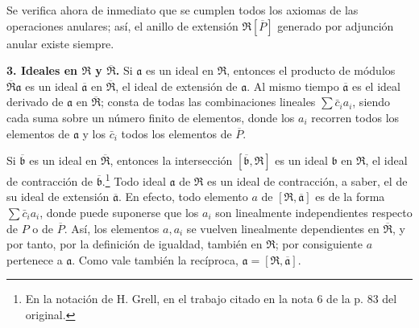 \documentclass[11pt]{article}
\begin{document}
Se verifica ahora de inmediato que se cumplen todos los axiomas de las operaciones anulares; así, el anillo de extensión $\mathfrak R[\overline P]$ generado por adjunción anular existe siempre.

\textbf{3. Ideales en $\mathfrak R$ y $\overline{\mathfrak R}$.} Si $\mathfrak a$ es un ideal en $\mathfrak R$, entonces el producto de módulos $\overline{\mathfrak R}\mathfrak a$ es un ideal $\overline{\mathfrak a}$ en $\overline{\mathfrak R}$, el ideal de extensión de $\mathfrak a$. Al mismo tiempo $\overline{\mathfrak a}$ es el ideal derivado de $\mathfrak a$ en $\overline{\mathfrak R}$; consta de todas las combinaciones lineales $\sum \bar c_i a_i$, siendo cada suma sobre un número finito de elementos, donde los $a_i$ recorren todos los elementos de $\mathfrak a$ y los $\bar c_i$ todos los elementos de $\overline P$.

Si $\overline{\mathfrak b}$ es un ideal en $\overline{\mathfrak R}$, entonces la intersección $[\overline{\mathfrak b},\mathfrak R]$ es un ideal $\mathfrak b$ en $\mathfrak R$, el ideal de contracción de $\overline{\mathfrak b}$.\footnote{En la notación de H. Grell, en el trabajo citado en la nota 6 de la p. 83 del original.} Todo ideal $\mathfrak a$ de $\mathfrak R$ es un ideal de contracción, a saber, el de su ideal de extensión $\overline{\mathfrak a}$. En efecto, todo elemento $a$ de $[\mathfrak R,\overline{\mathfrak a}]$ es de la forma $\sum\bar c_i a_i$, donde puede suponerse que los $a_i$ son linealmente independientes respecto de $P$ o de $\overline P$. Así, los elementos $a,a_i$ se vuelven linealmente dependientes en $\overline{\mathfrak R}$, y por tanto, por la definición de igualdad, también en $\mathfrak R$; por consiguiente $a$ pertenece a $\mathfrak a$. Como vale también la recíproca, $\mathfrak a=[\mathfrak R,\overline{\mathfrak a}]$.
\end{document}
